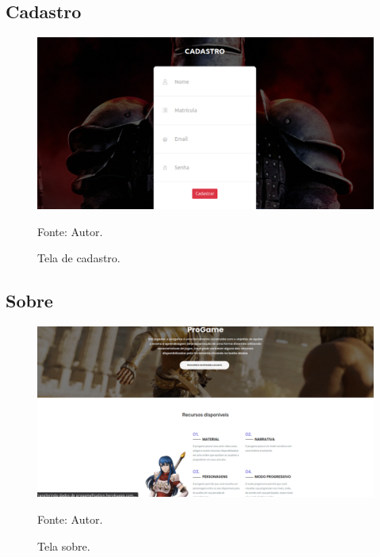 \subsection{Cadastro}
\begin{figure}[h]
	\centering
	\includegraphics[keepaspectratio=true,scale=0.32]{figuras/c.png}
	\caption{Tela de cadastro.}
	Fonte: Autor.
	\label{figurac}
\end{figure}

\subsection{Sobre}
\begin{figure}[h]
	\centering
	\includegraphics[keepaspectratio=true,scale=0.32]{figuras/d.png}
	\caption{Tela sobre.}
	Fonte: Autor.
	\label{figurad}
\end{figure}

\pagebreak


